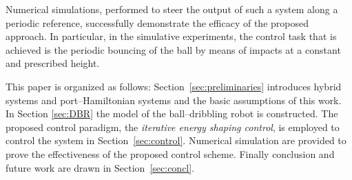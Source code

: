 {%
Numerical simulations, performed to steer the output of such a system along a periodic reference, successfully demonstrate the efficacy of the proposed approach. In particular, in the simulative experiments, the control task that is achieved is the periodic bouncing of the ball by means of impacts at a constant and prescribed height.

This paper is organized as follows: Section~\ref{sec:preliminaries} introduces hybrid systems and port--Hamiltonian systems and the basic assumptions of this work.
In Section \ref{sec:DBR} the model of the ball--dribbling robot is constructed. The proposed control paradigm, the \textit{iterative energy shaping control}, is employed to control the system in Section~\ref{sec:control}. Numerical simulation are provided to prove the effectiveness of the proposed control scheme.
Finally conclusion and future work are drawn in Section~\ref{sec:concl}.}
